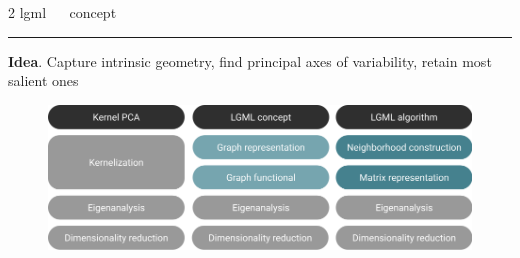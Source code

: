\documentclass[11pt, compress, t, notes = noshow, xcolor = table, 
aspectratio = 1610]{beamer}
\begin{document}
\LARGE
\begin{frame}{\textcolor{gray!90}{2 lgml} ~~ concept}
\normalsize
\vspace{-0.5cm}
\noindent \textcolor{gray!90}{\rule{\textwidth}{1pt}}
\smallskip

\textbf{Idea}. Capture intrinsic geometry, find principal axes of variability, 
retain most salient ones

\medskip

\begin{figure}[H]
  \includegraphics[trim = 0 0 0 0, clip, %
    width = \textwidth]{figures/kpca_lgml_algo}
\end{figure}

\end{frame}

\end{document}
